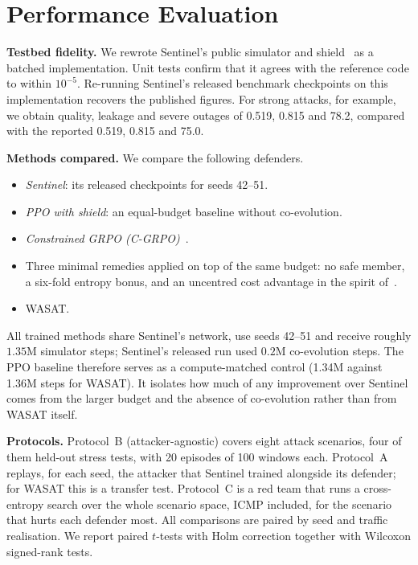 \documentclass[conference]{IEEEtran}
\begin{document}
\section{Performance Evaluation}
\label{sec:eval}
\textbf{Testbed fidelity.} We rewrote Sentinel's public simulator and shield~\cite{sentinelcode} as a batched implementation. Unit tests confirm that it agrees with the reference code to within $10^{-5}$. Re-running Sentinel's released benchmark checkpoints on this implementation recovers the published figures. For strong attacks, for example, we obtain quality, leakage and severe outages of 0.519, 0.815 and 78.2, compared with the reported 0.519, 0.815 and 75.0.

\textbf{Methods compared.} We compare the following defenders.
\begin{itemize}
\item \emph{Sentinel}: its released checkpoints for seeds 42--51.
\item \emph{PPO with shield}: an equal-budget baseline without co-evolution.
\item \emph{Constrained GRPO (C-GRPO)}~\cite{girgis2026cgrpo}.
\item Three minimal remedies applied on top of the same budget: no safe member, a six-fold entropy bonus, and an uncentred cost advantage in the spirit of~\cite{nie2026starvation}.
\item WASAT.
\end{itemize}
All trained methods share Sentinel's network, use seeds 42--51 and receive roughly $1.35$M simulator steps; Sentinel's released run used $0.2$M co-evolution steps. The PPO baseline therefore serves as a compute-matched control (1.34M against 1.36M steps for WASAT). It isolates how much of any improvement over Sentinel comes from the larger budget and the absence of co-evolution rather than from WASAT itself.

\textbf{Protocols.} Protocol~B (attacker-agnostic) covers eight attack scenarios, four of them held-out stress tests, with 20 episodes of 100 windows each. Protocol~A replays, for each seed, the attacker that Sentinel trained alongside its defender; for WASAT this is a transfer test. Protocol~C is a red team that runs a cross-entropy search over the whole scenario space, ICMP included, for the scenario that hurts each defender most. All comparisons are paired by seed and traffic realisation. We report paired $t$-tests with Holm correction together with Wilcoxon signed-rank tests.
\end{document}
